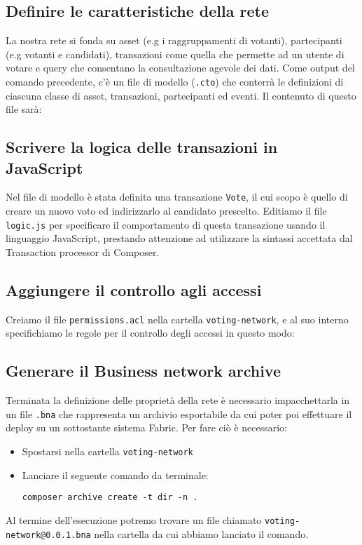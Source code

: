 	\subsection{Definire le caratteristiche della rete}
		La nostra rete si fonda su asset (e.g i raggruppamenti di votanti), partecipanti (e.g votanti e candidati), transazioni come quella che permette ad un utente di votare e query che consentano la consultazione agevole dei dati. Come output del comando precedente, c'è un file di modello (\lstinline{.cto}) che conterrà le definizioni di ciascuna classe di asset, transazioni, partecipanti ed eventi. Il contenuto di questo file sarà:
		

	\subsection{Scrivere la logica delle transazioni in JavaScript}
		Nel file di modello è stata definita una transazione \lstinline{Vote}, il cui scopo è quello di creare un nuovo voto ed indirizzarlo al candidato prescelto. Editiamo il file \lstinline{logic.js} per specificare il comportamento di questa transazione usando il linguaggio JavaScript, prestando attenzione ad utilizzare la sintassi accettata dal Transaction processor di Composer.
		

	\subsection{Aggiungere il controllo agli accessi}
		Creiamo il file \lstinline{permissions.acl} nella cartella \lstinline{voting-network}, e al suo interno specifichiamo le regole per il controllo degli accessi in questo modo:
		

	\subsection{Generare il Business network archive}
		Terminata la definizione delle proprietà della rete è necessario impacchettarla in un file \lstinline{.bna} che rappresenta un archivio esportabile da cui poter poi effettuare il deploy su un sottostante sistema Fabric.
		Per fare ciò è necessario:
		\begin{itemize}
			\item Spostarsi nella cartella \lstinline{voting-network}
			\item Lanciare il seguente comando da terminale:
				\begin{lstlisting}
composer archive create -t dir -n .
				\end{lstlisting}
		\end{itemize}
		Al termine dell'esecuzione potremo trovare un file chiamato \lstinline{voting-network@0.0.1.bna} nella cartella da cui abbiamo lanciato il comando.